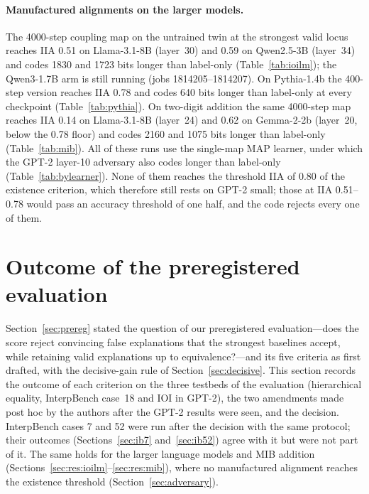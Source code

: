 \documentclass[11pt,a4paper]{article}
\begin{document}
\paragraph{Manufactured alignments on the larger models.} The 4000-step coupling map on the untrained twin at the strongest valid locus reaches IIA 0.51 on Llama-3.1-8B (layer~30) and 0.59 on Qwen2.5-3B (layer~34) and codes 1830 and 1723 bits longer than label-only (Table~\ref{tab:ioilm}); the Qwen3-1.7B arm is still running (jobs 1814205--1814207). On Pythia-1.4b the 400-step version reaches IIA 0.78 and codes 640 bits longer than label-only at every checkpoint (Table~\ref{tab:pythia}). On two-digit addition the same 4000-step map reaches IIA 0.14 on Llama-3.1-8B (layer~24) and 0.62 on Gemma-2-2b (layer~20, below the 0.78 floor) and codes 2160 and 1075 bits longer than label-only (Table~\ref{tab:mib}). All of these runs use the single-map MAP learner, under which the GPT-2 layer-10 adversary also codes longer than label-only (Table~\ref{tab:bylearner}). None of them reaches the threshold IIA of 0.80 of the existence criterion, which therefore still rests on GPT-2 small; those at IIA 0.51--0.78 would pass an accuracy threshold of one half, and the code rejects every one of them.

\section{Outcome of the preregistered evaluation}
\label{sec:gate}

Section~\ref{sec:prereg} stated the question of our preregistered evaluation---does the score reject convincing false explanations that the strongest baselines accept, while retaining valid explanations up to equivalence?---and its five criteria as first drafted, with the decisive-gain rule of Section~\ref{sec:decisive}. This section records the outcome of each criterion on the three testbeds of the evaluation (hierarchical equality, InterpBench case~18 and IOI in GPT-2), the two amendments made post hoc by the authors after the GPT-2 results were seen, and the decision. InterpBench cases 7 and 52 were run after the decision with the same protocol; their outcomes (Sections~\ref{sec:ib7} and~\ref{sec:ib52}) agree with it but were not part of it. The same holds for the larger language models and MIB addition (Sections~\ref{sec:res:ioilm}--\ref{sec:res:mib}), where no manufactured alignment reaches the existence threshold (Section~\ref{sec:adversary}).
\end{document}
